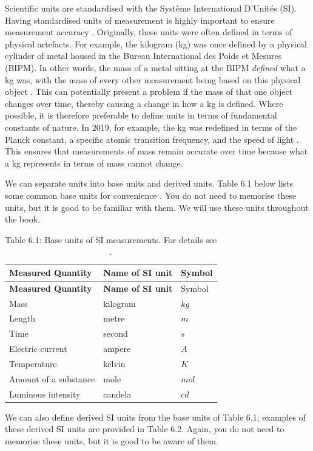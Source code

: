 \documentclass[
]{scrbook}
\begin{document}
Scientific units are standardised with the Système International D'Unités (SI).
Having standardised units of measurement is highly important to ensure measurement accuracy \citep{Quinn1995}.
Originally, these units were often defined in terms of physical artefacts.
For example, the kilogram (kg) was once defined by a physical cylinder of metal housed in the Bureau International des Poids et Mesures (BIPM).
In other words, the mass of a metal sitting at the BIPM \emph{defined} what a kg was, with the mass of every other measurement being based on this physical object \citep{Quinn1995, Freedman2011}.
This can potentially present a problem if the mass of that one object changes over time, thereby causing a change in how a kg is defined.
Where possible, it is therefore preferable to define units in terms of fundamental constants of nature.
In 2019, for example, the kg was redefined in terms of the Planck constant, a specific atomic transition frequency, and the speed of light \citep{Stock2019}.
This ensures that measurements of mass remain accurate over time because what a kg represents in terms of mass cannot change.

We can separate units into base units and derived units.
Table 6.1 below lists some common base units for convenience \citep{Quinn1995}.
You do not need to memorise these units, but it is good to be familiar with them.
We will use these units throughout the book.

\begin{longtable}[]{@{}lll@{}}
\caption{Table 6.1: Base units of SI measurements. For details see \citet{Quinn1995}.}\tabularnewline
\toprule
\textbf{Measured Quantity} & \textbf{Name of SI unit} & Symbol \\
\midrule
\endfirsthead
\toprule
\textbf{Measured Quantity} & \textbf{Name of SI unit} & Symbol \\
\midrule
\endhead
Mass & kilogram & \(kg\) \\
Length & metre & \(m\) \\
Time & second & \(s\) \\
Electric current & ampere & \(A\) \\
Temperature & kelvin & \(K\) \\
Amount of a substance & mole & \(mol\) \\
Luminous intensity & candela & \(cd\) \\
\bottomrule
\end{longtable}

We can also define derived SI units from the base units of Table 6.1; examples of these derived SI units are provided in Table 6.2.
Again, you do not need to memorise these units, but it is good to be aware of them.
\end{document}
